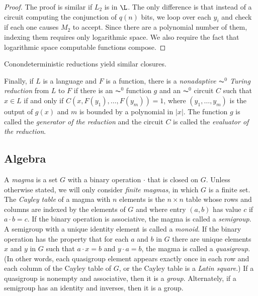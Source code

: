 \documentclass{article}
\begin{document}
\begin{proof}
  The proof is similar if $L_2$ is in $\L$.
  The only difference is that instead of a circuit computing the conjunction of $q(n)$ bits, we loop over each $y_i$ and check if each one causes $M_2$ to accept.
  Since there are a polynomial number of them, indexing them requires only logarithmic space.
  We also require the fact that logarithmic space computable functions compose.
\end{proof}

Conondeterministic reductions yield similar closures.

Finally, if $L$ is a language and $F$ is a function, there is a \emph{nonadaptive $\AC^0$ Turing reduction} from $L$ to $F$ if there is an $\AC^0$ function $g$ and an $\AC^0$ circuit $C$ such that $x \in L$ if and only if $C(x, F(y_1), \dotsc, F(y_m)) = 1$, where $(y_1, \dotsc, y_m)$ is the output of $g(x)$ and $m$ is bounded by a polynomial in $|x|$.
The function $g$ is called the \emph{generator of the reduction} and the circuit $C$ is called the \emph{evaluator of the reduction}.

\subsection{Algebra}

A \emph{magma} is a set $G$ with a binary operation $\cdot$ that is closed on $G$.
Unless otherwise stated, we will only consider \emph{finite magmas}, in which $G$ is a finite set.
The \emph{Cayley table} of a magma with $n$ elements is the $n \times n$ table whose rows and columns are indexed by the elements of $G$ and where entry $(a, b)$ has value $c$ if $a \cdot b = c$.
If the binary operation is associative, the magma is called a \emph{semigroup}.
A semigroup with a unique identity element is called a \emph{monoid}.
If the binary operation has the property that for each $a$ and $b$ in $G$ there are unique elements $x$ and $y$ in $G$ such that $a \cdot x = b$ and $y \cdot a = b$, the magma is called a \emph{quasigroup}.
(In other words, each quasigroup element appears exactly once in each row and each column of the Cayley table of $G$, or the Cayley table is a \emph{Latin square}.)
If a quasigroup is nonempty and associative, then it is a \emph{group}.
Alternately, if a semigroup has an identity and inverses, then it is a group.
\end{document}
